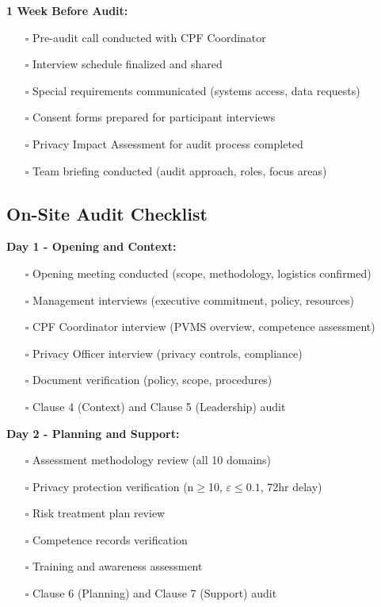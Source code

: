 \documentclass[11pt,a4paper]{article}
\begin{document}
\textbf{1 Week Before Audit:}

\begin{itemize}
\item[$\square$] Pre-audit call conducted with CPF Coordinator
\item[$\square$] Interview schedule finalized and shared
\item[$\square$] Special requirements communicated (systems access, data requests)
\item[$\square$] Consent forms prepared for participant interviews
\item[$\square$] Privacy Impact Assessment for audit process completed
\item[$\square$] Team briefing conducted (audit approach, roles, focus areas)
\end{itemize}

\subsection{On-Site Audit Checklist}

\textbf{Day 1 - Opening and Context:}

\begin{itemize}
\item[$\square$] Opening meeting conducted (scope, methodology, logistics confirmed)
\item[$\square$] Management interviews (executive commitment, policy, resources)
\item[$\square$] CPF Coordinator interview (PVMS overview, competence assessment)
\item[$\square$] Privacy Officer interview (privacy controls, compliance)
\item[$\square$] Document verification (policy, scope, procedures)
\item[$\square$] Clause 4 (Context) and Clause 5 (Leadership) audit
\end{itemize}

\textbf{Day 2 - Planning and Support:}

\begin{itemize}
\item[$\square$] Assessment methodology review (all 10 domains)
\item[$\square$] Privacy protection verification (n$\geq$10, $\varepsilon \leq 0.1$, 72hr delay)
\item[$\square$] Risk treatment plan review
\item[$\square$] Competence records verification
\item[$\square$] Training and awareness assessment
\item[$\square$] Clause 6 (Planning) and Clause 7 (Support) audit
\end{itemize}
\end{document}
